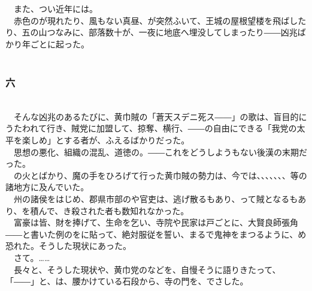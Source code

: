 \documentclass[
  paper=a5,
  fontsize=10pt,
  jafontsize=9.5pt,
  tate,                  %
  open_bracket_pos=nibu, %
]{jlreq}
\begin{document}
　また、つい近年には。\\


　赤色のが現れたり、風もない真昼、が突然ふいて、王城の屋根望楼を飛ばしたり、五の山つなみに、部落数十が、一夜に地底へ埋没してしまったり――凶兆ばかり年ごとに起った。\\

\\

\subsubsection{六}

\\


　そんな凶兆のあるたびに、黄巾賊の「蒼天スデニ死ス――」の歌は、盲目的にうたわれて行き、賊党に加盟して、掠奪、横行、――の自由にできる「我党の太平を楽しめ」とする者が、ふえるばかりだった。\\


　思想の悪化、組織の混乱、道徳の。――これをどうしようもない後漢の末期だった。\\


　の火とばかり、魔の手をひろげて行った黄巾賊の勢力は、今では、、、、、、、等の諸地方に及んでいた。\\


　州の諸侯をはじめ、郡県市部のや官吏は、逃げ散るもあり、って賊となるもあり、を積んで、き殺された者も数知れなかった。\\


　富豪は皆、財を捧げて、生命を乞い、寺院や民家は戸ごとに、大賢良師張角――と書いた例のをに貼って、絶対服従を誓い、まるで鬼神をまつるように、め恐れた。そうした現状にあった。\\


　さて。……\\


　長々と、そうした現状や、黄巾党のなどを、自慢そうに語りきたって、\\


「――」と、は、腰かけている石段から、寺の門を、でさした。\\
\end{document}
